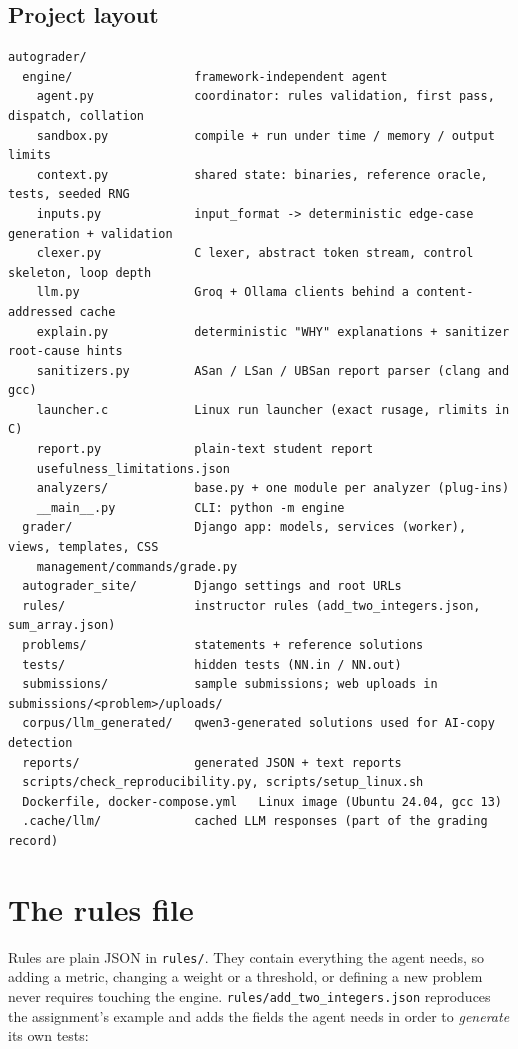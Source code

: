 \documentclass[11pt,a4paper]{article}
\newcommand{\file}[1]{\nolinkurl{#1}}
\begin{document}
\subsection{Project layout}
\begin{lstlisting}[basicstyle=\ttfamily\footnotesize]
autograder/
  engine/                 framework-independent agent
    agent.py              coordinator: rules validation, first pass, dispatch, collation
    sandbox.py            compile + run under time / memory / output limits
    context.py            shared state: binaries, reference oracle, tests, seeded RNG
    inputs.py             input_format -> deterministic edge-case generation + validation
    clexer.py             C lexer, abstract token stream, control skeleton, loop depth
    llm.py                Groq + Ollama clients behind a content-addressed cache
    explain.py            deterministic "WHY" explanations + sanitizer root-cause hints
    sanitizers.py         ASan / LSan / UBSan report parser (clang and gcc)
    launcher.c            Linux run launcher (exact rusage, rlimits in C)
    report.py             plain-text student report
    usefulness_limitations.json
    analyzers/            base.py + one module per analyzer (plug-ins)
    __main__.py           CLI: python -m engine
  grader/                 Django app: models, services (worker), views, templates, CSS
    management/commands/grade.py
  autograder_site/        Django settings and root URLs
  rules/                  instructor rules (add_two_integers.json, sum_array.json)
  problems/               statements + reference solutions
  tests/                  hidden tests (NN.in / NN.out)
  submissions/            sample submissions; web uploads in submissions/<problem>/uploads/
  corpus/llm_generated/   qwen3-generated solutions used for AI-copy detection
  reports/                generated JSON + text reports
  scripts/check_reproducibility.py, scripts/setup_linux.sh
  Dockerfile, docker-compose.yml   Linux image (Ubuntu 24.04, gcc 13)
  .cache/llm/             cached LLM responses (part of the grading record)
\end{lstlisting}

\section{The rules file}
Rules are plain JSON in \file{rules/}. They contain everything the agent needs, so adding a metric,
changing a weight or a threshold, or defining a new problem never requires touching the engine.
\file{rules/add_two_integers.json} reproduces the assignment's example and adds the fields the
agent needs in order to \emph{generate} its own tests:
\end{document}
